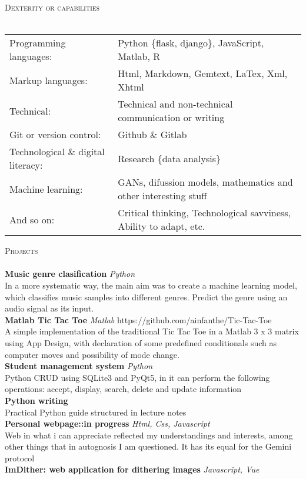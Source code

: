 \documentclass[a4paper]{article}
\newcommand{\lineunder} {
    \vspace*{-8pt} \\
    \hspace*{-18pt} \hrulefill \\
}
\newcommand{\header} [1] {
    {\hspace*{-18pt}\vspace*{6pt} \textsc{#1}}
    \vspace*{-6pt} \lineunder
}
\begin{document}
\header{Dexterity or capabilities}
\begin{tabular}{ l l }
	Programming languages:             & Python \{flask, django\}, JavaScript, Matlab, R                    \\
	Markup languages:                  & Html, Markdown, Gemtext, LaTex, Xml, Xhtml                         \\
	Technical:                         & Technical and non-technical communication or writing               \\
	Git or version control:            & Github \& Gitlab                                                   \\
	Technological \& digital literacy: & Research \{data analysis\}                                         \\
	Machine learning:                  & GANs, difussion models, mathematics and other interesting stuff    \\
	And so on:                         & Critical thinking, Technological savviness, Ability to adapt, etc. \\
\end{tabular}
\vspace{2mm}

\header{Projects}
{\textbf{Music genre clasification}} {\sl Python} \\
In a more systematic way, the main aim was to create a machine learning model, which classifies music samples into different genres. Predict the genre using an audio signal as its input.\\
\vspace*{2mm}
{\textbf{Matlab Tic Tac Toe}} {\sl Matlab} \hfill https://github.com/ainfanthe/Tic-Tac-Toe\\
A simple implementation of the traditional Tic Tac Toe in a Matlab 3 x 3 matrix using App Design, with declaration of some predefined conditionals such as computer moves and possibility of mode change.\\
\vspace*{2mm}
{\textbf{Student management system}} {\sl Python} \\
Python CRUD using SQLite3 and PyQt5, in it can perform the following operations: accept, display, search, delete and update information\\
\vspace*{2mm}
{\textbf{Python writing}}\\
Practical Python guide structured in lecture notes\\
\vspace*{2mm}
{\textbf{Personal webpage::in progress}} {\sl Html, Css, Javascript} \\
Web in what i can appreciate reflected my understandings and interests, among other things that in autognosis I am questioned. It has its equal for the Gemini protocol\\
\vspace*{2mm}
{\textbf{Im\textquotesingle{}Dither: web application for dithering images}} {\sl Javascript, Vue} \\
\end{document}
